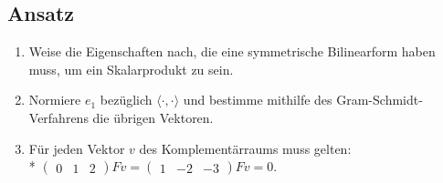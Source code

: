 \subsection{Ansatz}
\begin{enumerate}
	\item Weise die Eigenschaften nach, die eine symmetrische Bilinearform haben muss, um ein Skalarprodukt zu sein. 
	\item Normiere \( e_1 \) bezüglich \( \langle \cdot, \cdot \rangle \) und bestimme mithilfe des Gram-Schmidt-Verfahrens die übrigen Vektoren.
	\item Für jeden Vektor \( v \) des Komplementärraums muss gelten: \\* \( \begin{pmatrix}
		0 & 1 & 2
	\end{pmatrix}Fv = \begin{pmatrix}
		1 & -2 & -3
	\end{pmatrix}Fv = 0 \).
\end{enumerate}

